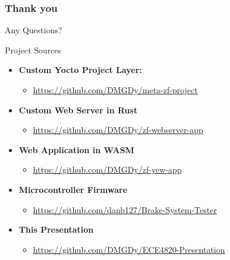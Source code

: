 \documentclass[8pt,compress,aspectratio=169]{beamer}
\newcommand\DarkBoldP[1]{\textcolor{VSPurpleDark}{\textbf{#1}}}
\begin{document}
\begin{frame}
  \frametitle{Thank you}
  Any Questions?
  \begin{block}{Project Sources}
    \begin{itemize}
      \item \DarkBoldP{Custom Yocto Project Layer:}
        \begin{itemize}
          \item \url{https://github.com/DMGDy/meta-zf-project}
        \end{itemize}
      \item \DarkBoldP{Custom Web Server in Rust} 
        \begin{itemize}
          \item \url{https://github.com/DMGDy/zf-webserver-app}
        \end{itemize}
      \item \DarkBoldP{Web Application in WASM}
        \begin{itemize}
          \item  \url{https://github.com/DMGDy/zf-yew-app}
        \end{itemize}
      \item \DarkBoldP{Microcontroller Firmware}
        \begin{itemize}
          \item \url{https://github.com/danb127/Brake-System-Tester}
        \end{itemize}
      \item \DarkBoldP{This Presentation}
        \begin{itemize}
          \item \url{https://github.com/DMGDy/ECE4820-Presentation}
        \end{itemize}
    \end{itemize}
  \end{block}
\end{frame}
\end{document}
